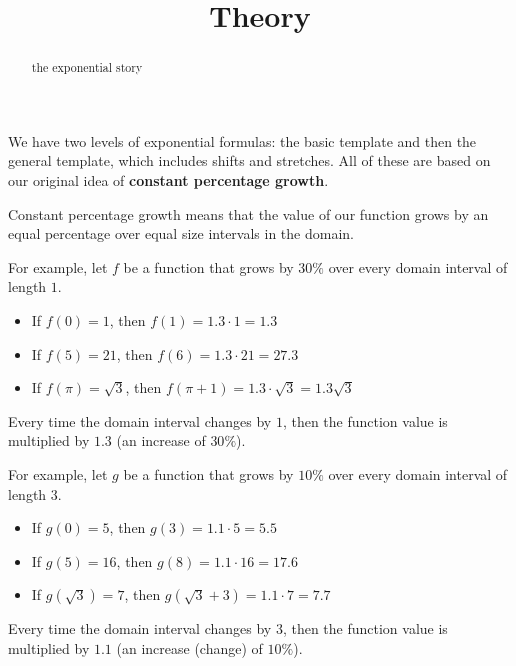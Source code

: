 \documentclass{ximera}
\title{Theory}
\begin{document}
\begin{abstract}
the exponential story
\end{abstract}
\maketitle





We have two levels of exponential formulas: the basic template and then the general template, which includes shifts and stretches.  All of these are based on our original idea of \textbf{\textcolor{purple!85!blue}{constant percentage growth}}.


Constant percentage growth means that the value  of our function grows by an equal percentage over equal size intervals in the domain.



For example, let $f$ be a function that grows by $30\%$ over every domain interval of length $1$. \\


\begin{itemize}
\item If $f(0) = 1$, then $f(1) = 1.3 \cdot 1 = 1.3$
\item If $f(5) = 21$, then $f(6) = 1.3 \cdot 21 = 27.3$
\item If $f(\pi) = \sqrt{3}$, then $f(\pi + 1) = 1.3 \cdot \sqrt{3} = 1.3 \sqrt{3}$
\end{itemize}

Every time the domain interval changes by $1$, then the function value is multiplied by $1.3$ (an increase of $30\%$).






For example, let $g$ be a function that grows by $10\%$ over every domain interval of length $3$. \\


\begin{itemize}
\item If $g(0) = 5$, then $g(3) = 1.1 \cdot 5  = 5.5$
\item If $g(5) = 16$, then $g(8) = 1.1 \cdot 16  = 17.6$
\item If $g(\sqrt{3}) = 7$, then $g(\sqrt{3} + 3) = 1.1 \cdot 7 = 7.7$
\end{itemize}

Every time the domain interval changes by $3$, then the function value is multiplied by $1.1$ (an increase (change) of $10\%$).
\end{document}
